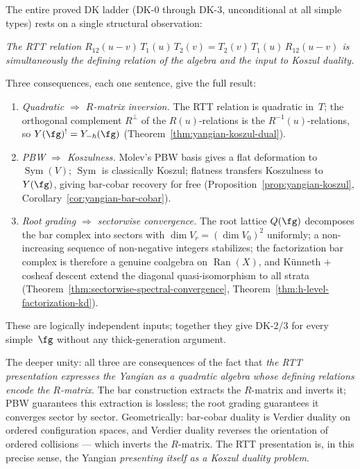 \begin{remark}
\label{rem:rtt-is-the-duality-datum}
The entire proved DK ladder (DK-0 through DK-3, unconditional at
all simple types) rests on a single structural observation:
\smallskip
\begin{center}
\emph{The RTT relation
$R_{12}(u\!-\!v)\,T_1(u)\,T_2(v)
= T_2(v)\,T_1(u)\,R_{12}(u\!-\!v)$
is simultaneously the defining relation of the algebra
and the input to Koszul duality.}
\end{center}

\smallskip\noindent
Three consequences, each one sentence, give the full result:
\begin{enumerate}[label=\textup{(\alph*)}]
\item \emph{Quadratic $\Rightarrow$ $R$-matrix inversion.}
  The RTT relation is quadratic in~$T$; the orthogonal complement
  $R^\perp$ of the $R(u)$-relations is the $R^{-1}(u)$-relations,
  so $Y(\fg)^! = Y_{-\hbar}(\fg)$
  (Theorem~\ref{thm:yangian-koszul-dual}).

\item \emph{PBW $\Rightarrow$ Koszulness.}
  Molev's PBW basis gives a flat deformation to
  $\operatorname{Sym}(V)$; $\operatorname{Sym}$ is classically
  Koszul; flatness transfers Koszulness to~$Y(\fg)$, giving
  bar-cobar recovery for free
  (Proposition~\ref{prop:yangian-koszul},
  Corollary~\ref{cor:yangian-bar-cobar}).

\item \emph{Root grading $\Rightarrow$ sectorwise convergence.}
  The root lattice $Q(\fg)$ decomposes the bar complex into sectors
  with $\dim V_r = (\dim V_0)^2$ uniformly; a non-increasing
  sequence of non-negative integers stabilizes; the factorization
  bar complex is therefore a genuine coalgebra on
  $\operatorname{Ran}(X)$, and K\"unneth $+$ cosheaf descent extend
  the diagonal quasi-isomorphism to all strata
  (Theorem~\ref{thm:sectorwise-spectral-convergence},
  Theorem~\ref{thm:h-level-factorization-kd}).
\end{enumerate}
These are logically independent inputs; together they give DK-2/3
for every simple~$\fg$ without any thick-generation argument.

The deeper unity: all three are consequences of the fact that
\emph{the RTT presentation expresses the Yangian as a quadratic
algebra whose defining relations encode the $R$-matrix}.
The bar construction extracts the $R$-matrix and inverts it;
PBW guarantees this extraction is lossless; the root grading
guarantees it converges sector by sector.  Geometrically:
bar-cobar duality is Verdier duality on ordered configuration
spaces, and Verdier duality reverses the orientation of ordered
collisions --- which inverts the $R$-matrix.  The RTT presentation
is, in this precise sense, the Yangian \emph{presenting itself as
a Koszul duality problem}.


\end{remark}
